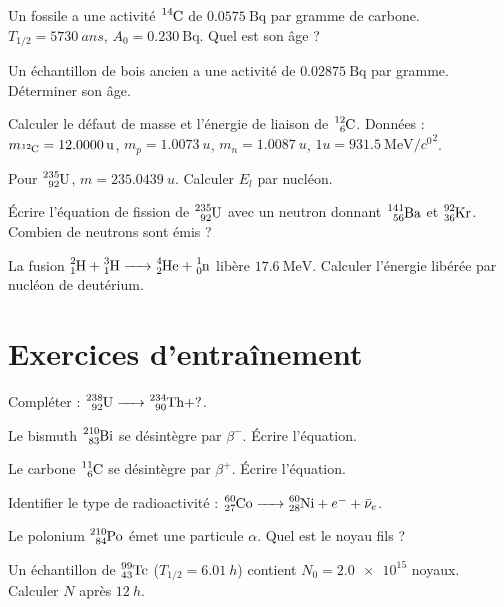 
\exo{} Un fossile a une activité $\ce{^{14}C}$ de $\SI{0.0575}{\becquerel}$ par gramme de carbone. $T_{1/2} = \SI{5730}{ans}$, $A_0 = \SI{0.230}{\becquerel}$. Quel est son âge ?

\exo{} Un échantillon de bois ancien a une activité de $\SI{0.02875}{\becquerel}$ par gramme. Déterminer son âge.


\exo{} Calculer le défaut de masse et l'énergie de liaison de $\ce{^{12}_{6}C}$. Données : $m_{\ce{^{12}C}} = \SI{12.0000}{u}$, $m_p = \SI{1.0073}{u}$, $m_n = \SI{1.0087}{u}$, $1 u = \SI{931.5}{\MeV\per\clight\squared}$.

\exo{} Pour $\ce{^{235}_{92}U}$, $m = \SI{235.0439}{u}$. Calculer $E_l$ par nucléon.


\exo{} Écrire l'équation de fission de $\ce{^{235}_{92}U}$ avec un neutron donnant $\ce{^{141}_{56}Ba}$ et $\ce{^{92}_{36}Kr}$. Combien de neutrons sont émis ?

\exo{} La fusion $\ce{^{2}_{1}H + ^{3}_{1}H -> ^{4}_{2}He + ^{1}_{0}n}$ libère $\SI{17.6}{\MeV}$. Calculer l'énergie libérée par nucléon de deutérium.

\section{Exercices d'entraînement}


\exo{} Compléter : $\ce{^{238}_{92}U -> ^{234}_{90}Th} + ?$.

\exo{} Le bismuth $\ce{^{210}_{83}Bi}$ se désintègre par $\beta^-$. Écrire l'équation.

\exo{} Le carbone $\ce{^{11}_{6}C}$ se désintègre par $\beta^+$. Écrire l'équation.

\exo{} Identifier le type de radioactivité : $\ce{^{60}_{27}Co -> ^{60}_{28}Ni} + e^- + \bar{\nu}_e$.

\exo{} Le polonium $\ce{^{210}_{84}Po}$ émet une particule $\alpha$. Quel est le noyau fils ?


\exo{} Un échantillon de $\ce{^{99}_{43}Tc}$ ($T_{1/2} = \SI{6.01}{h}$) contient $N_0 = \num{2.0e15}$ noyaux. Calculer $N$ après $\SI{12}{h}$.

